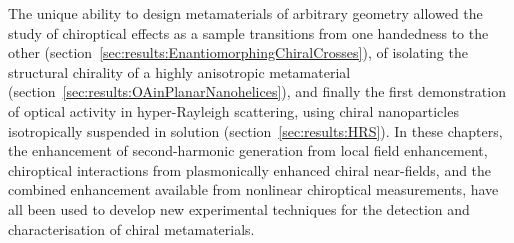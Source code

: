 The unique ability to design metamaterials of arbitrary geometry allowed the study of chiroptical effects as a sample transitions from one handedness to the other (section~\ref{sec:results:EnantiomorphingChiralCrosses}), of isolating the structural chirality of a highly anisotropic metamaterial (section~\ref{sec:results:OAinPlanarNanohelices}), and finally the first demonstration of optical activity in hyper-Rayleigh scattering, using chiral nanoparticles isotropically suspended in solution (section~\ref{sec:results:HRS}). In these chapters, the enhancement of second-harmonic generation from local field enhancement, chiroptical interactions from plasmonically enhanced chiral near-fields, and the combined enhancement available from nonlinear chiroptical measurements, have all been used to develop new experimental techniques for the detection and characterisation of chiral metamaterials.
